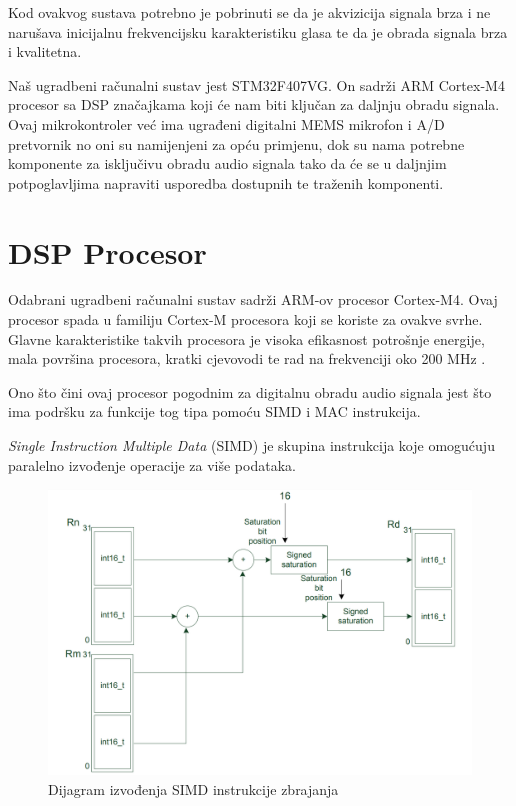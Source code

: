 \documentclass[times, utf8, diplomski]{fer}
\begin{document}
Kod ovakvog sustava potrebno je pobrinuti se da je akvizicija signala brza i ne narušava inicijalnu frekvencijsku karakteristiku glasa te da je obrada signala brza i kvalitetna. 

Naš ugradbeni računalni sustav jest STM32F407VG. On sadrži ARM Cortex-M4 procesor sa DSP značajkama koji će nam biti ključan za daljnju obradu signala. Ovaj mikrokontroler već ima ugrađeni digitalni MEMS mikrofon i A/D pretvornik no oni su namijenjeni za opću primjenu, dok su nama potrebne komponente za isključivu obradu audio signala tako da će se u daljnjim potpoglavljima napraviti usporedba dostupnih te traženih komponenti.

\section{DSP Procesor}
\label{instr}
Odabrani ugradbeni računalni sustav sadrži ARM-ov procesor Cortex-M4. Ovaj procesor spada u familiju Cortex-M procesora koji se koriste za ovakve svrhe. Glavne karakteristike takvih procesora je visoka efikasnost potrošnje energije, mala površina procesora, kratki cjevovodi te rad na frekvenciji oko 200 MHz \citep{cortexm4}.

Ono što čini ovaj procesor pogodnim za digitalnu obradu audio signala jest što ima podršku za funkcije tog tipa pomoću SIMD i MAC instrukcija.

\textit{Single Instruction Multiple Data} (SIMD) je skupina instrukcija koje omogućuju paralelno izvođenje operacije za više podataka.

\begin{figure}[hbt!]
 \centering
 \includegraphics[scale=0.4]{photos/simd.png}
 \caption{Dijagram izvođenja SIMD instrukcije zbrajanja}
 \label{SIMD}
\end{figure}
\end{document}
